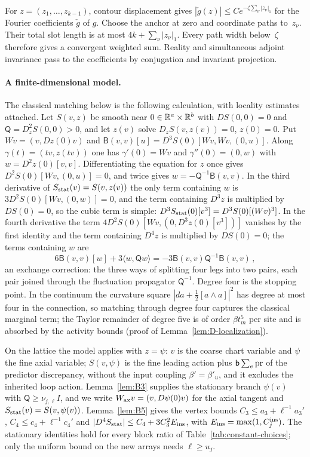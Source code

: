 For $z=(z_1,\ldots,z_{k-1})$, contour displacement gives $|\check g(z)|\le Ce^{-\zeta\sum_\nu|z_\nu|_1}$ for the Fourier coefficients $\check g$ of $g$. Choose the anchor at zero and coordinate paths to~$z_\nu$. Their total slot length is at most $4k+\sum_\nu|z_\nu|_1$. Every path width below~$\zeta$ therefore gives a convergent weighted sum. Reality and simultaneous adjoint invariance pass to the coefficients by conjugation and invariant projection.

\paragraph{A finite-dimensional model.} The classical matching below is the following calculation, with locality estimates attached. Let $S(v,z)$ be smooth near $0\in\mathbb{R}^a\times\mathbb{R}^b$ with $DS(0,0)=0$ and $\mathsf Q=D_z^2S(0,0)>0$, and let $z(v)$ solve $D_zS(v,z(v))=0$, $z(0)=0$. Put $Wv=(v,Dz(0)v)$ and $\mathsf B(v,v)[u]=D^3S(0)[Wv,Wv,(0,u)]$. Along $\gamma(t)=(tv,z(tv))$ one has $\gamma'(0)=Wv$ and $\gamma''(0)=(0,w)$ with $w=D^2z(0)[v,v]$. Differentiating the equation for $z$ once gives $D^2S(0)[Wv,(0,u)]=0$, and twice gives $w=-\mathsf Q^{-1}\mathsf B(v,v)$. In the third derivative of $S_{\rm stat}(v)=S(v,z(v))$ the only term containing $w$ is $3D^2S(0)[Wv,(0,w)]=0$, and the term containing $D^3z$ is multiplied by $DS(0)=0$, so the cubic term is simple: $D^3S_{\rm stat}(0)[v^3]=D^3S(0)[(Wv)^3]$. In the fourth derivative the term $4D^2S(0)[Wv,(0,D^3z(0)[v^3])]$ vanishes by the first identity and the term containing $D^4z$ is multiplied by $DS(0)=0$; the terms containing $w$ are
\begin{equation*}
6\mathsf B(v,v)[w]+3\langle w,\mathsf Qw\rangle=-3\mathsf B(v,v)\mathsf Q^{-1}\mathsf B(v,v)\,,
\end{equation*}
an exchange correction: the three ways of splitting four legs into two pairs, each pair joined through the fluctuation propagator $\mathsf Q^{-1}$. Degree four is the stopping point. In the continuum the curvature square $|da+\tfrac12[a\wedge a]|^2$ has degree at most four in the connection, so matching through degree four captures the classical marginal term; the Taylor remainder of degree five is of order $\beta t_m^5$ per site and is absorbed by the activity bounds (proof of Lemma~\ref{lem:D-localization}).

On the lattice the model applies with $z=\psi$: $v$ is the coarse chart variable and $\psi$ the fine axial variable; $S(v,\psi)$ is the fine leading action plus $\mathsf{b}\sum_e\operatorname{pr}$ of the predictor discrepancy, without the input coupling $\beta'=\beta'_u$, and it excludes the inherited loop action. Lemma~\ref{lem:B3} supplies the stationary branch $\psi(v)$ with $\mathsf Q\ge\nu_{j,\ell}I$, and we write $W_{\rm ax}v=(v,D\psi(0)v)$ for the axial tangent and $S_{\rm stat}(v)=S(v,\psi(v))$. Lemma~\ref{lem:B5} gives the vertex bounds $C_3\le a_3+\ell^{-1}a_3'$, $C_4\le c_4+\ell^{-1}c_4'$ and $|D^4S_{\rm stat}|\le C_4+3C_3^2E_{\rm ins}$, with $E_{\rm ins}=\max(1,C_j^{\rm ins})$. The stationary identities hold for every block ratio of Table~\ref{tab:constant-choices}; only the uniform bound on the new arrays needs $\ell\ge u_j$.

